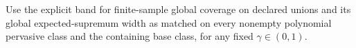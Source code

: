 Use the explicit band for finite-sample global coverage on declared unions and its global expected-supremum width as matched on every nonempty polynomial pervasive class and the containing base class, for any fixed \(\gamma\in(0,1)\).